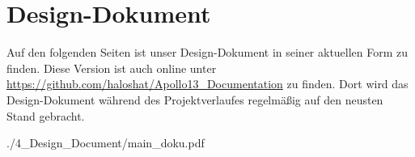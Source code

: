 \documentclass{article}
\begin{document}
\newpage
\thispagestyle{empty}
\tableofcontents
\thispagestyle{empty}
\newpage
\setcounter{page}{1}







\newpage

\section{Design-Dokument}
Auf den folgenden Seiten ist unser Design-Dokument in seiner aktuellen Form zu finden. Diese Version ist auch online unter \url{https://github.com/haloshat/Apollo13_Documentation} zu finden. Dort wird das Design-Dokument während des Projektverlaufes regelmäßig auf den neusten Stand gebracht.

{./4_Design_Document/main_doku.pdf}
\end{document}
